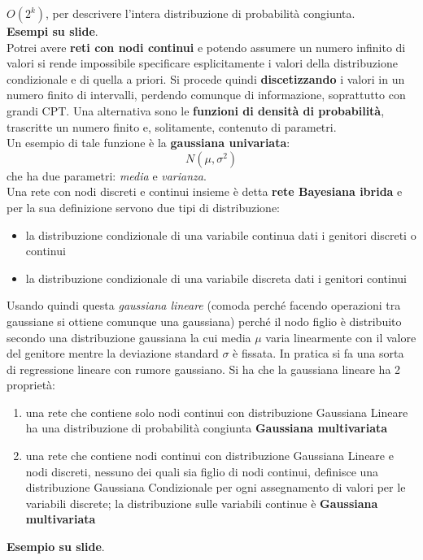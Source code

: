 \message{ !name(modprob.tex)}\documentclass[a4paper,12pt, oneside]{book}
\begin{document}
$O(2^k)$, per descrivere l'intera distribuzione di probabilità congiunta.\\
\textbf{Esempi su slide}.\\
Potrei avere \textbf{reti con nodi continui} e potendo assumere un numero
infinito di valori si rende impossibile specificare esplicitamente i valori della
distribuzione condizionale e di quella a priori. Si procede quindi
\textbf{discetizzando} i valori in un numero finito di intervalli, perdendo
comunque di informazione, soprattutto con grandi CPT. Una alternativa sono le
\textbf{funzioni di densità di probabilità}, trascritte un numero finito e,
solitamente, contenuto di parametri.\\
Un esempio di tale funzione è la \textbf{gaussiana univariata}:
\[N(\mu,\sigma^2)\]
che ha due parametri: \textit{media} e \textit{varianza}.\\
Una rete con nodi discreti e continui insieme è detta \textbf{rete Bayesiana
  ibrida} e per la sua definizione servono due tipi di distribuzione:
\begin{itemize}
  \item la distribuzione condizionale di una variabile continua dati i genitori
  discreti o continui
  \item la distribuzione condizionale di una variabile discreta dati i genitori
  continui 
\end{itemize}
Usando quindi questa \textit{gaussiana lineare} (comoda perché facendo
operazioni tra gaussiane si ottiene comunque una gaussiana) perché il nodo
figlio è 
distribuito secondo una distribuzione gaussiana la cui media $\mu$ varia
linearmente con il valore del genitore mentre la deviazione standard $\sigma$ è
fissata. In pratica si fa una sorta di regressione lineare con rumore
gaussiano. Si ha che la gaussiana lineare ha 2 proprietà:
\begin{enumerate}
  \item una rete che contiene solo nodi continui con distribuzione Gaussiana
  Lineare ha una 
  distribuzione di probabilità congiunta \textbf{Gaussiana multivariata}
  \item una rete che contiene nodi continui con distribuzione Gaussiana Lineare
  e nodi discreti, 
  nessuno dei quali sia figlio di nodi continui, definisce una distribuzione
  Gaussiana Condizionale 
  per ogni assegnamento di valori per le variabili discrete; la distribuzione
  sulle variabili continue 
  è \textbf{Gaussiana multivariata}
\end{enumerate}
\textbf{Esempio su slide}.\\
\end{document}
